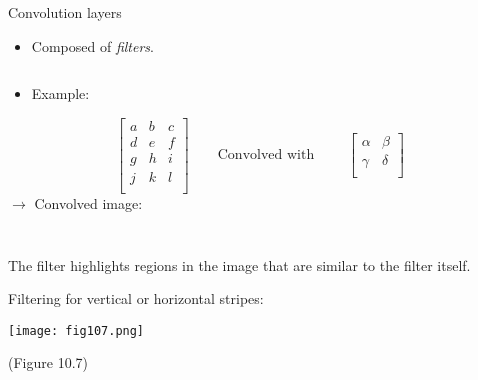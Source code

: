\documentclass[
  10pt,
  ignorenonframetext,
]{beamer}
\providecommand{\tightlist}{%
  \setlength{\itemsep}{0pt}\setlength{\parskip}{0pt}}
\begin{document}
\begin{frame}
\begin{block}{Convolution layers}
\protect\hypertarget{convolution-layers}{}
\(~\)

\begin{itemize}
\tightlist
\item
  Composed of \emph{filters}.
\end{itemize}

\(~\)

\begin{itemize}
\tightlist
\item
  Example:
\end{itemize}

\[\left[ 
\begin{matrix}
a & b & c \\
d & e & f \\
g & h & i\\
j & k & l \\
\end{matrix}
\right] \qquad \text{Convolved with } \qquad 
\left[ 
\begin{matrix}
\alpha & \beta \\
\gamma & \delta \\
\end{matrix}\right] \] \(\rightarrow\) Convolved image:

\(~\)

\vspace{2cm}

\(~\)

The filter highlights regions in the image that are similar to the
filter itself.
\end{block}
\end{frame}

\begin{frame}
Filtering for vertical or horizontal stripes:

\centering

\texttt{[image: fig107.png]}

\scriptsize

(Figure 10.7)
\end{frame}
\end{document}
